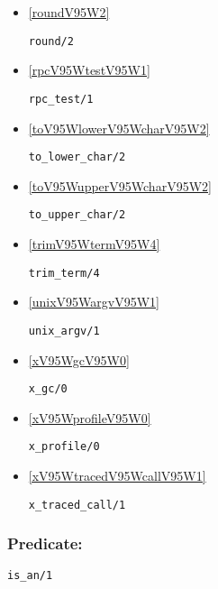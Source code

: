 \begin{itemize}
\item \ref{roundV95W2} 
\begin{verbatim}
round/2
\end{verbatim}

\item \ref{rpcV95WtestV95W1} 
\begin{verbatim}
rpc_test/1
\end{verbatim}

\item \ref{toV95WlowerV95WcharV95W2} 
\begin{verbatim}
to_lower_char/2
\end{verbatim}

\item \ref{toV95WupperV95WcharV95W2} 
\begin{verbatim}
to_upper_char/2
\end{verbatim}

\item \ref{trimV95WtermV95W4} 
\begin{verbatim}
trim_term/4
\end{verbatim}

\item \ref{unixV95WargvV95W1} 
\begin{verbatim}
unix_argv/1
\end{verbatim}

\item \ref{xV95WgcV95W0} 
\begin{verbatim}
x_gc/0
\end{verbatim}

\item \ref{xV95WprofileV95W0} 
\begin{verbatim}
x_profile/0
\end{verbatim}

\item \ref{xV95WtracedV95WcallV95W1} 
\begin{verbatim}
x_traced_call/1
\end{verbatim}

\end{itemize}

\subsubsection{Predicate:} \label{isV95WanV95W1}

\begin{verbatim}
is_an/1
\end{verbatim}

